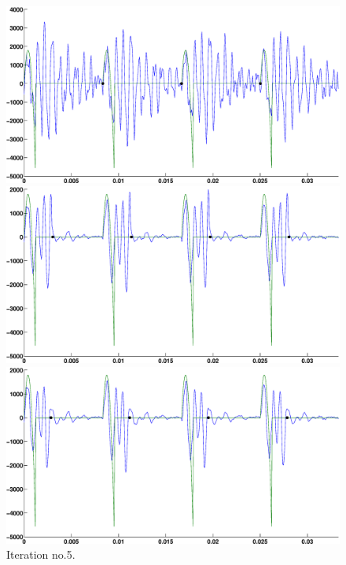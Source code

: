 \documentclass[12pt,a4]{article}
\begin{document}
\begin{figure}[H]
\begin{center}
 \caption*{In figures \ref{fig:app3-beginning} to \ref{fig:app3-end} the signal frequency is 123 Hz. The approximation algorithm acquired $Q_{guess} = 0.341$ at the end of the iterations, while the actual parameter $Q = 0.15$, relative error of the reconstruction $\approx$ 98.4\%, $\alpha \approx 8.3$. }
 \includegraphics[width=.68\textwidth]{img/Approx_iter_wRef-v3-1.eps}
 \caption{Iteration no.1}\label{fig:app3-beginning}
 \includegraphics[width=.68\textwidth]{img/Approx_iter_wRef-v3-2.eps}
 \caption{Iteration no.2}
 \includegraphics[width=.68\textwidth]{img/Approx_iter_wRef-v3-3.eps}
 \caption{Iteration no.5.}
\end{center}
\end{figure}
\end{document}
